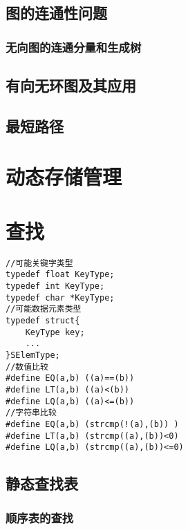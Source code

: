 \documentclass[UTF8]{ctexart}
\begin{document}
\subsection{图的连通性问题}


\subsubsection{无向图的连通分量和生成树}









\subsection{有向无环图及其应用}


\subsection{最短路径}







\newpage
\section{动态存储管理}



\newpage
\section{查找}
\begin{lstlisting}[style=v1]
//可能关键字类型
typedef float KeyType;
typedef int KeyType;
typedef char *KeyType;
//可能数据元素类型
typedef struct{
    KeyType key;
    ...
}SElemType;
//数值比较
#define EQ(a,b) ((a)==(b))
#define LT(a,b) ((a)<(b))
#define LQ(a,b) ((a)<=(b))
//字符串比较
#define EQ(a,b) (strcmp(!(a),(b)) )
#define LT(a,b) (strcmp((a),(b))<0)
#define LQ(a,b) (strcmp((a),(b))<=0)

\end{lstlisting}




\subsection{静态查找表}
\subsubsection{顺序表的查找}
\end{document}
